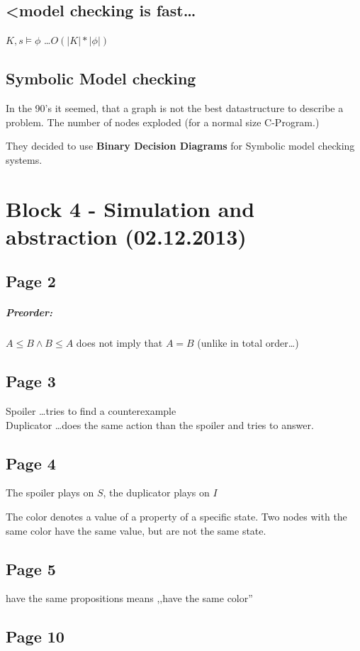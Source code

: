 \documentclass[a4paper]{article}
\newcommand{\entails}[1]{\models{#1}}
\begin{document}
\subsection{<model checking is fast\ldots}
$K, s \entails{} \phi $ \ldots $O(|K|*|\phi |)$

\subsection{Symbolic Model checking}
In the 90's it seemed, that a graph is not the best datastructure to describe a
problem. The number of nodes exploded (for a normal size C-Program.)

They decided to use \textbf{Binary Decision Diagrams} for Symbolic model
checking systems.

\section{Block 4 - Simulation and abstraction (02.12.2013)}
\subsection{Page 2}
\subparagraph{Preorder:} $A \leq B \wedge B \leq A $ does not imply that $ A =
B$ (unlike in total order\ldots)

\subsection{Page 3}
Spoiler \ldots tries to find a counterexample\\
Duplicator \ldots does the same action than the spoiler and tries to answer.

\subsection{Page 4}
The spoiler plays on $S$, the duplicator plays on $I$

The color denotes a value of a property of a specific state. Two nodes with the
same color have the same value, but are not the same state.


\subsection{Page 5}
have the same propositions means ,,have the same color''

\subsection{Page 10}
\end{document}
